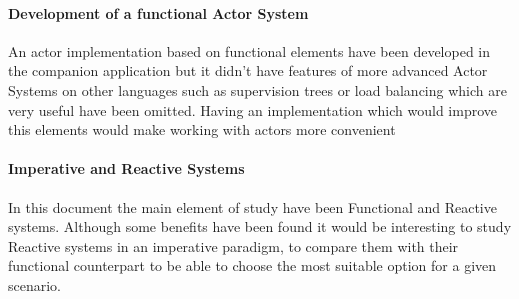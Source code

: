 \documentclass[../main.tex]{subfiles}
\begin{document}
\paragraph{Development of a functional Actor System}

An actor implementation based on functional elements have been developed in the
companion application but it didn't have features of more advanced Actor Systems
on other languages such as supervision trees or load balancing which are very
useful have been omitted. Having an implementation which would improve this
elements would make working with actors more convenient

\paragraph{Imperative and Reactive Systems}

In this document the main element of study have been Functional and Reactive
systems. Although some benefits have been found it would be interesting to study
Reactive systems in an imperative paradigm, to compare them with their
functional counterpart to be able to choose the most suitable option for a given
scenario.
\end{document}
